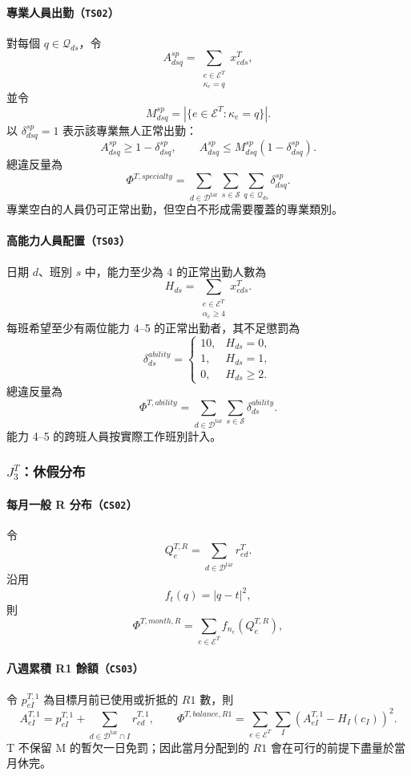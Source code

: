 \documentclass[a4paper,12pt]{article}
\begin{document}
\paragraph{專業人員出勤（\texttt{TS02}）}
對每個 \(q\in\mathcal{Q}_{ds}\)，令
\[
  A^{sp}_{dsq}
  =
  \sum_{\substack{e\in\mathcal{E}^{T}\\\kappa_e=q}}x^{T}_{eds},
\]
並令
\[
  M^{sp}_{dsq}
  =
  \left|\{e\in\mathcal{E}^{T}:\kappa_e=q\}\right|.
\]
以 \(\delta^{sp}_{dsq}=1\) 表示該專業無人正常出勤：
\[
  A^{sp}_{dsq}\geq1-\delta^{sp}_{dsq},
  \qquad
  A^{sp}_{dsq}\leq M^{sp}_{dsq}(1-\delta^{sp}_{dsq}).
\]
總違反量為
\[
  \Phi^{T,specialty}
  =
  \sum_{d\in\mathcal{D}^{\mathrm{tar}}}
  \sum_{s\in\mathcal{S}}
  \sum_{q\in\mathcal{Q}_{ds}}\delta^{sp}_{dsq}.
\]
專業空白的人員仍可正常出勤，但空白不形成需要覆蓋的專業類別。

\paragraph{高能力人員配置（\texttt{TS03}）}
日期 \(d\)、班別 \(s\) 中，能力至少為 4 的正常出勤人數為
\[
  H_{ds}
  =
  \sum_{\substack{e\in\mathcal{E}^{T}\\\alpha_e\geq4}}x^{T}_{eds}.
\]
每班希望至少有兩位能力 4--5 的正常出勤者，其不足懲罰為
\[
  \delta^{ability}_{ds}
  =
  \begin{cases}
    10, & H_{ds}=0,\\
    1, & H_{ds}=1,\\
    0, & H_{ds}\geq2.
  \end{cases}
\]
總違反量為
\[
  \Phi^{T,ability}
  =
  \sum_{d\in\mathcal{D}^{\mathrm{tar}}}
  \sum_{s\in\mathcal{S}}\delta^{ability}_{ds}.
\]
能力 4--5 的跨班人員按實際工作班別計入。

\subsubsection{\texorpdfstring{$J^T_3$}{J3}：休假分布}

\paragraph{每月一般 R 分布（\texttt{CS02}）}
令
\[
  Q^{T,R}_e=\sum_{d\in\mathcal{D}^{\mathrm{tar}}}r^{T}_{ed}.
\]
沿用
\[
  f_t(q)=|q-t|^2,
\]
則
\[
  \Phi^{T,month,R}
  =
  \sum_{e\in\mathcal{E}^{T}}f_{n_e}\!\left(Q^{T,R}_e\right),
\]

\paragraph{八週累積 R1 餘額（\texttt{CS03}）}
令 \(p^{T,1}_{eI}\) 為目標月前已使用或折抵的 \(R1\) 數，則
\[
  A^{T,1}_{eI}=p^{T,1}_{eI}
  +\sum_{d\in\mathcal D^{\mathrm{tar}}\cap I}r^{T,1}_{ed},
  \qquad
  \Phi^{T,balance,R1}=\sum_{e\in\mathcal E^T}\sum_I
  \left(A^{T,1}_{eI}-H_I(c_I)\right)^2.
\]
T 不保留 M 的暫欠一日免罰；因此當月分配到的 \(R1\) 會在可行的前提下盡量於當月休完。
\end{document}
